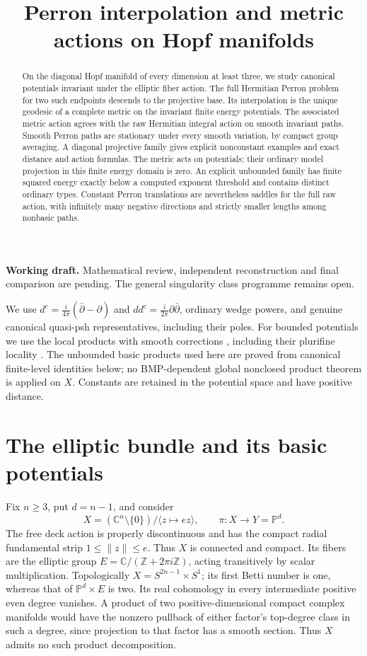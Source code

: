 \documentclass[11pt]{article}
\title{Perron interpolation and metric actions on Hopf manifolds}
\author{}
\date{}
\newcommand{\ddc}{dd^c}
\newcommand{\PP}{\mathbb P}
\theoremstyle{remark}\newtheorem{remark}[theorem]{Remark}
\begin{document}
\maketitle
\noindent\textbf{Working draft.} Mathematical review, independent
reconstruction and final comparison are pending. The general singularity
class programme remains open.
\begin{abstract}
On the diagonal Hopf manifold of every dimension at least three, we study
canonical potentials invariant under the elliptic fiber action. The full
Hermitian Perron problem for two such endpoints descends to the projective
base. Its interpolation is the unique geodesic of a complete metric on the
invariant finite energy potentials. The associated metric action agrees
with the raw Hermitian integral action on smooth invariant paths. Smooth
Perron paths are stationary under every smooth variation, by compact group
averaging. A diagonal projective family gives explicit nonconstant examples
and exact distance and action formulas. The metric acts on potentials;
their ordinary model projection in this finite energy domain is zero.
An explicit unbounded family has finite squared energy exactly below a
computed exponent threshold and contains distinct ordinary types.
Constant Perron translations are nevertheless saddles for the full raw
action, with infinitely many negative directions and strictly smaller
lengths among nonbasic paths.
\end{abstract}

We use $d^c=\frac{i}{4\pi}(\bar\partial-\partial)$ and
$\ddc=\frac{i}{2\pi}\partial\bar\partial$, ordinary wedge powers,
and genuine canonical quasi-psh representatives, including their poles.
For bounded potentials we use the local products with smooth corrections
\cite[Section 2.1 and Proposition 2.1]{BGL}, including their plurifine
locality \cite{BTfine}. The unbounded basic products used here are proved
from canonical finite-level identities below; no BMP-dependent global
nonclosed product theorem is applied on $X$. Constants are retained in
the potential space and have positive distance.

\section{The elliptic bundle and its basic potentials}
Fix $n\geq3$, put $d=n-1$, and consider
\[
 X=(\mathbb C^n\setminus\{0\})/\langle z\mapsto ez\rangle,
 \qquad \pi:X\longrightarrow Y=\PP^d.
\]
The free deck action is properly discontinuous and has the compact radial
fundamental strip $1\leq\lVert z\rVert\leq e$. Thus $X$ is connected and
compact. Its fibers are the elliptic group
$E=\mathbb C/(\mathbb Z+2\pi i\mathbb Z)$, acting transitively by
scalar multiplication. Topologically $X=S^{2n-1}\times S^1$; its first
Betti number is one, whereas that of $\PP^d\times E$ is two.
Its real cohomology in every intermediate positive even degree vanishes.
A product of two positive-dimensional compact complex manifolds would
have the nonzero pullback of either factor's top-degree class in such
a degree, since projection to that factor has a smooth section.
Thus $X$ admits no such product decomposition.
\end{document}

